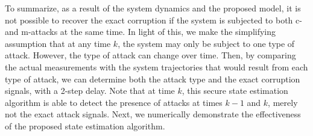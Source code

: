 To summarize, as a result of the system dynamics and the proposed model, it is not possible to recover the exact corruption if the system is subjected to both c- and m-attacks at the same time. In light of this, we make the simplifying assumption that at any time $k$, the system may only be subject to one type of attack. However, the type of attack can change over time. Then, by comparing the actual measurements with the system trajectories that would result from each type of attack, we can determine both the attack type and the exact corruption signals, with a 2-step delay. Note that at time $k$, this secure state estimation algorithm is able to detect the presence of attacks at times $k-1$ and $k$, merely not the exact attack signals.
Next, we numerically demonstrate the effectiveness of the proposed state estimation algorithm.




